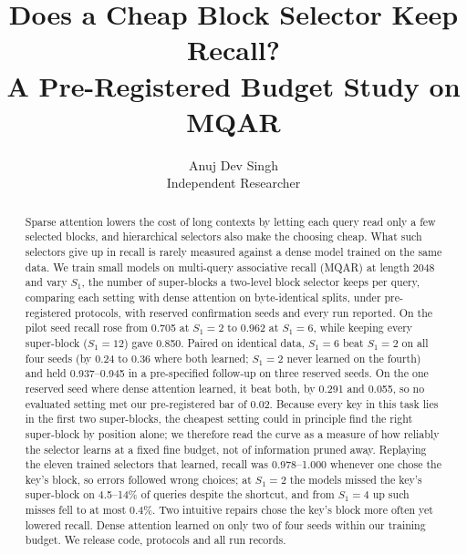 \documentclass[11pt]{article}
\title{Does a Cheap Block Selector Keep Recall?\\A Pre-Registered Budget Study on MQAR}
\author{Anuj Dev Singh\\Independent Researcher}
\date{}
\begin{document}
\maketitle

\begin{abstract}
Sparse attention lowers the cost of long contexts by letting each query read only a few selected blocks, and
hierarchical selectors also make the choosing cheap. What such selectors give up in recall is rarely measured against
a dense model trained on the same data. We train small models on multi-query associative recall (MQAR) at length 2048
and vary $S_1$, the number of super-blocks a two-level block selector keeps per query, comparing each setting with
dense attention on byte-identical splits, under pre-registered protocols, with reserved confirmation seeds and every
run reported. On the pilot seed recall rose from 0.705 at $S_1{=}2$ to 0.962 at $S_1{=}6$, while keeping every
super-block ($S_1{=}12$) gave 0.850. Paired on identical data, $S_1{=}6$ beat $S_1{=}2$ on all four seeds (by 0.24 to
0.36 where both learned; $S_1{=}2$ never learned on the fourth) and held 0.937--0.945 in a pre-specified follow-up on three reserved seeds. On the one reserved seed where dense attention learned, it beat both, by
0.291 and 0.055, so no evaluated setting met our pre-registered bar of 0.02. Because every key in this task lies in the first two
super-blocks, the cheapest setting could in principle find the right super-block by position alone; we therefore read
the curve as a measure of how reliably the selector learns at a fixed fine budget, not of information pruned away. Replaying
the eleven trained selectors that learned, recall was 0.978--1.000 whenever one chose the key's block, so errors followed wrong choices;
at $S_1{=}2$ the models missed the key's super-block on 4.5--14\% of queries despite the shortcut, and from $S_1{=}4$ up
such misses fell to at most 0.4\%. Two intuitive repairs chose the key's block more often yet lowered recall. Dense attention learned on
only two of four seeds within our training budget. We release code, protocols and all run records.
\end{abstract}














\appendix

\end{document}
